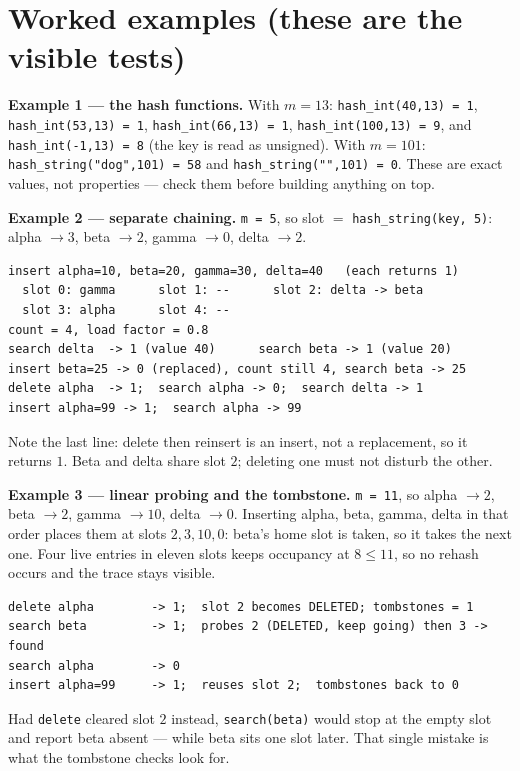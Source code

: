 \documentclass[11pt]{article}
\begin{document}
\section{Worked examples (these are the visible tests)}

\textbf{Example 1 --- the hash functions.} With $m = 13$: \texttt{hash\_int(40,13) = 1}, \texttt{hash\_int(53,13) = 1}, \texttt{hash\_int(66,13) = 1}, \texttt{hash\_int(100,13) = 9}, and \texttt{hash\_int(-1,13) = 8} (the key is read as unsigned). With $m = 101$: \texttt{hash\_string("dog",101) = 58} and \texttt{hash\_string("",101) = 0}. These are exact values, not properties --- check them before building anything on top.

\textbf{Example 2 --- separate chaining.} \texttt{m = 5}, so slot $=$ \texttt{hash\_string(key, 5)}: alpha $\to 3$, beta $\to 2$, gamma $\to 0$, delta $\to 2$.

\begin{verbatim}
insert alpha=10, beta=20, gamma=30, delta=40   (each returns 1)
  slot 0: gamma      slot 1: --      slot 2: delta -> beta
  slot 3: alpha      slot 4: --
count = 4, load factor = 0.8
search delta  -> 1 (value 40)      search beta -> 1 (value 20)
insert beta=25 -> 0 (replaced), count still 4, search beta -> 25
delete alpha  -> 1;  search alpha -> 0;  search delta -> 1
insert alpha=99 -> 1;  search alpha -> 99
\end{verbatim}
Note the last line: delete then reinsert is an insert, not a replacement, so it returns $1$. Beta and delta share slot $2$; deleting one must not disturb the other.

\textbf{Example 3 --- linear probing and the tombstone.} \texttt{m = 11}, so alpha $\to 2$, beta $\to 2$, gamma $\to 10$, delta $\to 0$. Inserting alpha, beta, gamma, delta in that order places them at slots $2, 3, 10, 0$: beta's home slot is taken, so it takes the next one. Four live entries in eleven slots keeps occupancy at $8 \le 11$, so no rehash occurs and the trace stays visible.

\begin{verbatim}
delete alpha        -> 1;  slot 2 becomes DELETED; tombstones = 1
search beta         -> 1;  probes 2 (DELETED, keep going) then 3 -> found
search alpha        -> 0
insert alpha=99     -> 1;  reuses slot 2;  tombstones back to 0
\end{verbatim}
Had \texttt{delete} cleared slot $2$ instead, \texttt{search(beta)} would stop at the empty slot and report beta absent --- while beta sits one slot later. That single mistake is what the tombstone checks look for.
\end{document}
